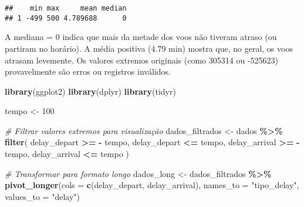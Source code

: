 \documentclass[
]{article}
\newenvironment{Shaded}{\begin{snugshade}}{\end{snugshade}}
\newcommand{\AttributeTok}[1]{\textcolor[rgb]{0.13,0.29,0.53}{#1}}
\newcommand{\CommentTok}[1]{\textcolor[rgb]{0.56,0.35,0.01}{\textit{#1}}}
\newcommand{\DecValTok}[1]{\textcolor[rgb]{0.00,0.00,0.81}{#1}}
\newcommand{\FunctionTok}[1]{\textcolor[rgb]{0.13,0.29,0.53}{\textbf{#1}}}
\newcommand{\NormalTok}[1]{#1}
\newcommand{\OtherTok}[1]{\textcolor[rgb]{0.56,0.35,0.01}{#1}}
\newcommand{\SpecialCharTok}[1]{\textcolor[rgb]{0.81,0.36,0.00}{\textbf{#1}}}
\newcommand{\StringTok}[1]{\textcolor[rgb]{0.31,0.60,0.02}{#1}}
\begin{document}
\begin{verbatim}
##    min max     mean median
## 1 -499 500 4.789688      0
\end{verbatim}

A mediana = 0 indica que mais da metade dos voos não tiveram atraso (ou
partiram no horário). A média positiva (4.79 min) mostra que, no geral,
os voos atrasam levemente. Os valores extremos originais (como 305314 ou
-525623) provavelmente são erros ou registros inválidos.

\begin{Shaded}
\begin{Highlighting}[]
\FunctionTok{library}\NormalTok{(ggplot2)}
\FunctionTok{library}\NormalTok{(dplyr)}
\FunctionTok{library}\NormalTok{(tidyr)}

\NormalTok{tempo }\OtherTok{\textless{}{-}} \DecValTok{100}

\CommentTok{\# Filtrar valores extremos para visualização}
\NormalTok{dados\_filtrados }\OtherTok{\textless{}{-}}\NormalTok{ dados }\SpecialCharTok{\%\textgreater{}\%}
  \FunctionTok{filter}\NormalTok{(}
\NormalTok{    delay\_depart }\SpecialCharTok{\textgreater{}=} \SpecialCharTok{{-}}\NormalTok{ tempo, delay\_depart }\SpecialCharTok{\textless{}=}\NormalTok{ tempo,}
\NormalTok{    delay\_arrival }\SpecialCharTok{\textgreater{}=} \SpecialCharTok{{-}}\NormalTok{ tempo, delay\_arrival }\SpecialCharTok{\textless{}=}\NormalTok{ tempo}
\NormalTok{  )}

\CommentTok{\# Transformar para formato longo}
\NormalTok{dados\_long }\OtherTok{\textless{}{-}}\NormalTok{ dados\_filtrados }\SpecialCharTok{\%\textgreater{}\%}
  \FunctionTok{pivot\_longer}\NormalTok{(}\AttributeTok{cols =} \FunctionTok{c}\NormalTok{(delay\_depart, delay\_arrival),}
               \AttributeTok{names\_to =} \StringTok{"tipo\_delay"}\NormalTok{,}
               \AttributeTok{values\_to =} \StringTok{"delay"}\NormalTok{)}


\end{Highlighting}
\end{Shaded}
\end{document}
